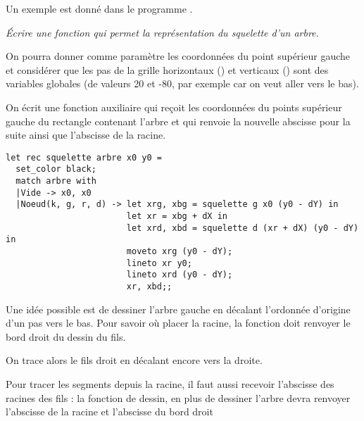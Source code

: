 Un exemple est donné dans le programme .%
\begin{Exercise}\it Écrire une fonction qui permet la représentation du squelette d'un arbre.

On pourra donner comme paramètre les coordonnées du point supérieur gauche et considérer que les pas de la grille  horizontaux () et verticaux () sont des variables globales (de valeurs 20 et -80, par exemple car on veut aller vers le bas).
\end{Exercise}
\begin{Answer}
On écrit une fonction auxiliaire qui reçoit les coordonnées du points supérieur gauche du rectangle contenant l'arbre et qui renvoie la nouvelle abscisse pour la suite ainsi que l'abscisse de la racine.
\begin{lstlisting}
let rec squelette arbre x0 y0 =
  set_color black;
  match arbre with
  |Vide -> x0, x0
  |Noeud(k, g, r, d) -> let xrg, xbg = squelette g x0 (y0 - dY) in
                        let xr = xbg + dX in
                        let xrd, xbd = squelette d (xr + dX) (y0 - dY) in
                        moveto xrg (y0 - dY);
                        lineto xr y0;
                        lineto xrd (y0 - dY);
                        xr, xbd;;
\end{lstlisting}
\newpage
\end{Answer}
Une idée possible est de dessiner l'arbre gauche en décalant l'ordonnée d'origine d'un pas vers le bas.
Pour savoir où placer la racine, la fonction doit renvoyer le bord droit du dessin du fils. 

On trace alors le fils droit en décalant encore vers la droite.

Pour tracer les segments depuis la racine, il faut aussi recevoir l'abscisse des racines des fils : la fonction de dessin, en plus de dessiner l'arbre devra renvoyer l'abscisse de la racine et l'abscisse du bord droit

\medskip

